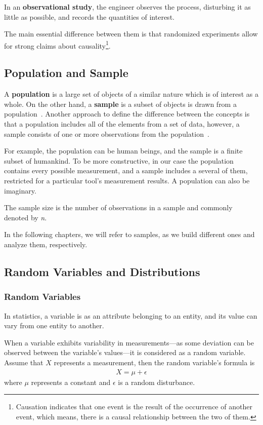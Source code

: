 In an \textbf{observational study}, the engineer observes the process, disturbing it as little
as possible, and records the quantities of interest.

The main essential difference between them is that randomized experiments allow for strong claims about causality\footnote{Causation indicates that one event is the result of the occurrence of another event, which means, there is a causal relationship between the two of them.}.

\subsection{Population and Sample}

A \textbf{population} is a large set of objects of a similar nature which is of interest as a whole. On the other hand, a \textbf{sample} is a subset of objects is drawn from a population~\cite{sample1}. Another approach to define the difference between the concepts is that a population includes all of the elements from a set of data, however, a sample consists of one or more observations from the population~\cite{sample2}.

For example, the population can be human beings, and the sample is a finite subset of humankind. To be more constructive, in our case the population contains every possible measurement, and a sample includes a several of them, restricted for a particular tool's measurement results. A population can also be imaginary. 

The sample size is the number of observations in a sample and commonly denoted by \textit{n}.

In the following chapters, we will refer to samples, as we build different ones and analyze them, respectively.

\subsection{Random Variables and Distributions}

\subsubsection{Random Variables}
In statistics, a variable is as an attribute belonging to an entity, and its value can vary from one entity to another.

When a variable exhibits variability in measurements---as some deviation can be observed between the variable's values---it is considered as a random variable. Assume that $X$ represents a measurement, then the random variable's formula is
\begin{align} \label{eq:random_variable}
	X = \mu + \epsilon
\end{align} 
where $\mu$ represents a constant and $\epsilon$ is a random disturbance.

